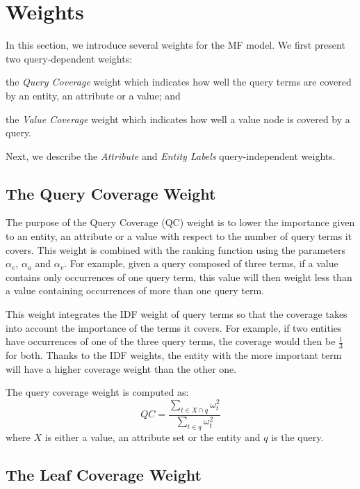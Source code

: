 \section{Weights}
\label{sec:weights}

In this section, we introduce several weights for the MF model. We first present two query-dependent weights: 
\begin{inparaenum}[(1)]
  \item the \emph{Query Coverage} weight which indicates how well the query terms are covered by an entity, an attribute or a value; and
  \item the \emph{Value Coverage} weight which indicates how well a value node is covered by a query.
\end{inparaenum}
Next, we describe the \emph{Attribute} and \emph{Entity Labels} query-independent weights.

\subsection{The Query Coverage Weight}
\label{sec:kw-factor}

The purpose of the Query Coverage (QC) weight is to lower the importance given to an entity, an attribute or a value with respect to the number of query terms it covers. This weight is combined with the ranking function using the parameters $\alpha_e$, $\alpha_a$ and $\alpha_v$. For example, given a query composed of three terms, if a value contains only occurrences of one query term, this value will then weight less than a value containing occurrences of more than one query term.

This weight integrates the IDF weight of query terms so that the coverage takes into account the importance of the terms it covers. For example, if two entities have occurrences of one of the three query terms, the coverage would then be $\frac{1}{3}$ for both. Thanks to the IDF weights, the entity with the more important term will have a higher coverage weight than the other one.

The query coverage weight is computed as:
$$
QC = \frac{\sum_{t\in X \cap q}{\omega_t^2}}{\sum_{t\in q}{\omega_t^2}}
$$
where $X$ is either a value, an attribute set or the entity and $q$ is the query.

\subsection{The Leaf Coverage Weight}
\label{sec:coverage}

